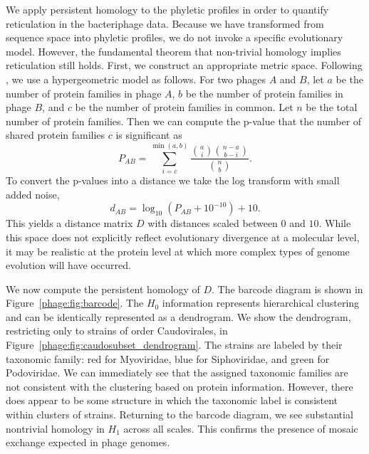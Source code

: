 We apply persistent homology to the phyletic profiles in order to quantify reticulation in the bacteriphage data.
Because we have transformed from sequence space into phyletic profiles, we do not invoke a specific evolutionary model.
However, the fundamental theorem that non-trivial homology implies reticulation still holds.
First, we construct an appropriate metric space.
Following \cite{LimaMendez:2008ki}, we use a hypergeometric model as follows.
For two phages $A$ and $B$, let $a$ be the number of protein families in phage $A$, $b$ be the number of protein families in phage $B$, and $c$ be the number of protein families in common.
Let $n$ be the total number of protein families.
Then we can compute the p-value that the number of shared protein families $c$ is significant as
\begin{equation}
P_{AB} = \sum_{i=c}^{\min(a,b)} \frac{\binom{a}{i}\binom{n-a}{b-i}}{\binom{n}{b}}.
\end{equation}
To convert the p-values into a distance we take the log transform with small added noise,
\begin{equation}
d_{AB} = \log_{10}(P_{AB} + 10^{-10}) + 10.
\end{equation}
This yields a distance matrix $D$ with distances scaled between $0$ and $10$.
While this space does not explicitly reflect evolutionary divergence at a molecular level, it may be realistic at the protein level at which more complex types of genome evolution will have occurred.

We now compute the persistent homology of $D$.
The barcode diagram is shown in Figure~\ref{phage:fig:barcode}.
The $H_0$ information represents hierarchical clustering and can be identically represented as a dendrogram.
We show the dendrogram, restricting only to strains of order Caudovirales, in Figure~\ref{phage:fig:caudosubset_dendrogram}.
The strains are labeled by their taxonomic family: red for Myoviridae, blue for Siphoviridae, and green for Podoviridae.
We can immediately see that the assigned taxonomic families are not consistent with the clustering based on protein information.
However, there does appear to be some structure in which the taxonomic label is consistent within clusters of strains.
Returning to the barcode diagram, we see substantial nontrivial homology in $H_1$ across all scales.
This confirms the presence of mosaic exchange expected in phage genomes.


